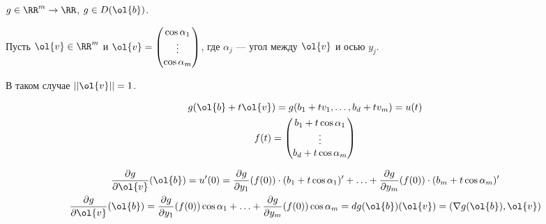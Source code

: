 \begin{example}{}{}
    \( g \in \RR^m \to \RR \), \( g \in D(\ol{b}) \).

    Пусть \( \ol{v} \in \RR^m \) и
    \(
        \ol{v} = \begin{pmatrix}
            \cos \alpha_1
            \\
            \vdots
            \\
            \cos \alpha_m
        \end{pmatrix}
    \), где \( \alpha_j \) --- угол между \( \ol{v} \) и осью \( y_j \).

    В таком случае \( || \ol{v} || = 1 \).

    \begin{gather*}
        g(\ol{b} + t \ol{v}) = g(b_1 + t v_1, \ldots, b_d + t v_m) = u(t)
        \\
        f(t) = \begin{pmatrix}
            b_1 + t \cos \alpha_1
            \\
            \vdots
            \\
            b_d + t \cos \alpha_m
        \end{pmatrix}
    \end{gather*}

    \begin{gather*}
        \frac{\partial g}{\partial \ol{v}} ( \ol{b} )
        =
        u' (0)
        =
        \frac{\partial g}{\partial y_1} (f(0)) \cdot (b_1 + t \cos \alpha_1)'
            +
            \ldots
            +
            \frac{\partial g}{\partial y_m} (f(0)) \cdot (b_m + t \cos \alpha_m)'
        \\
        \frac{\partial g}{\partial \ol{v}} ( \ol{b} )
        =
        \frac{\partial g}{\partial y_1} (f(0)) \cos \alpha_1
            +
            \ldots
            +
            \frac{\partial g}{\partial y_m} (f(0)) \cos \alpha_m
        =
        dg (\ol{b})(\ol{v})
        =
        (\nabla g(\ol{b}), \ol{v})
    \end{gather*}
\end{example}

